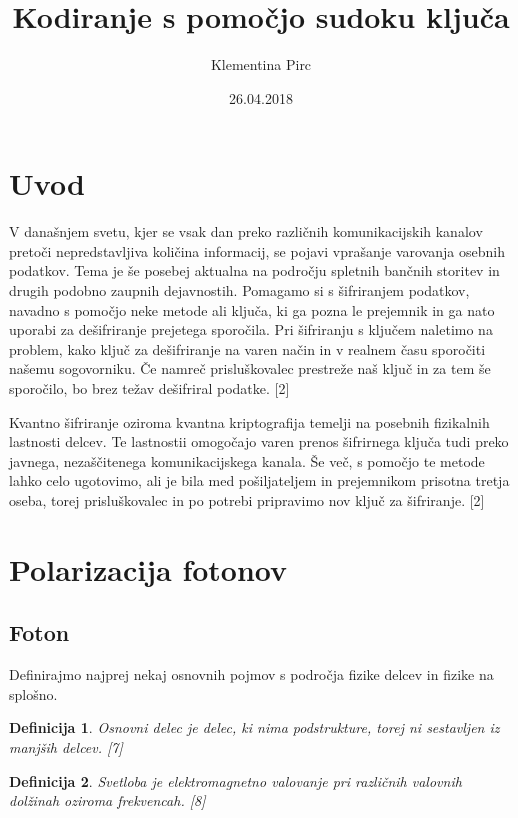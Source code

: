 \documentclass[A4paper, 11pt]{article}
\title{Kodiranje s pomočjo sudoku ključa}
\author{Klementina Pirc}
\date{26.04.2018}
\newtheorem{definicija}{Definicija}
\begin{document}
\maketitle



\section{Uvod}

V današnjem svetu, kjer se vsak dan preko različnih komunikacijskih kanalov pretoči nepredstavljiva količina informacij, se pojavi vprašanje varovanja osebnih podatkov. Tema je še posebej aktualna na področju spletnih bančnih storitev in drugih podobno zaupnih dejavnostih. Pomagamo si s šifriranjem podatkov, navadno s pomočjo neke metode ali ključa, ki ga pozna le prejemnik in ga nato uporabi za dešifriranje prejetega sporočila. Pri šifriranju s ključem naletimo na problem, kako ključ za dešifriranje na varen način in v realnem času sporočiti našemu sogovorniku. Če namreč prisluškovalec prestreže naš ključ in za tem še sporočilo, bo brez težav dešifriral podatke. [2]

Kvantno šifriranje oziroma kvantna kriptografija temelji na posebnih fizikalnih lastnosti delcev. Te lastnostii omogočajo varen prenos šifrirnega ključa tudi preko javnega, nezaščitenega komunikacijskega kanala. Še več, s pomočjo te metode lahko celo ugotovimo, ali je bila med pošiljateljem in prejemnikom prisotna tretja oseba, torej prisluškovalec in po potrebi pripravimo nov ključ za šifriranje. [2]



\section{Polarizacija fotonov}

\subsection{Foton}

Definirajmo najprej nekaj osnovnih pojmov s področja fizike delcev in fizike na splošno.

\begin{definicija}
Osnovni delec je delec, ki nima podstrukture, torej ni sestavljen iz manjših delcev. [7]
\end{definicija}

\begin{definicija}
Svetloba je elektromagnetno valovanje pri različnih valovnih dolžinah oziroma frekvencah. [8]
\end{definicija}
\end{document}
